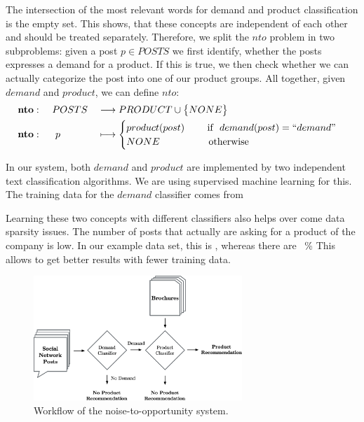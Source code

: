 The intersection of the most relevant words for demand and product classification is the empty set.
This shows, that these concepts are independent of each other and should be treated separately.
Therefore, we split the $nto$ problem in two subproblems: given a post $p \in POSTS$ we first identify, whether the posts expresses a demand for a product.
If this is true, we then check whether we can actually categorize the post into one of our product groups.
All together, given $demand$ and $product$, we can define $nto$:
\begin{alignat*}{3}
  &\mathbf{nto}: && ~POSTS && \longrightarrow PRODUCT \cup \big\{ NONE \big\} \\
  &\mathbf{nto}: && ~~p   && \longmapsto \begin{cases}
	    product(post)~~~~~~~\text{if }~demand(post) = ``demand" \\
	    NONE~~~~~~~~~~~~~~~\text{otherwise}
   \end{cases}
\end{alignat*}

In our system, both $demand$ and $product$ are implemented by two independent text classification algorithms.
We are using supervised machine learning for this.
The training data for the $demand$ classifier comes from 

Learning these two concepts with different classifiers also helps over come data sparsity issues.
The number of posts that actually are asking for a product of the company is low.
In our example data set, this is , whereas there are ~\%
This allows to get better results with fewer training data.

\begin{figure}
	\caption{Workflow of the noise-to-opportunity system.}
	\begin{center}
		\includegraphics[width=0.7\textwidth]{figures/nto_workflow.eps}
	\end{center}
\end{figure}

